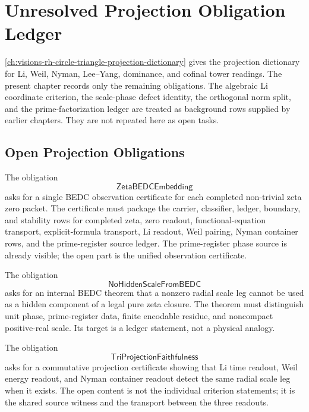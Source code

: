 \chapter{Unresolved Projection Obligation Ledger}
\label{ch:visions-rh-unresolved-projection-obligation-ledger}

\autoref{ch:visions-rh-circle-triangle-projection-dictionary} gives the
projection dictionary for Li, Weil, Nyman, Lee--Yang, dominance, and
cofinal tower readings. The present chapter records only the remaining
obligations. The algebraic Li coordinate criterion, the scale-phase
defect identity, the orthogonal norm split, and the prime-factorization
ledger are treated as background rows supplied by earlier chapters. They
are not repeated here as open tasks.

\section{Open Projection Obligations}
\label{sec:rh-unresolved-projection-obligations}

\begin{definition}
\label{def:rh-zeta-bedc-embedding-obligation}
The obligation
$$
\mathsf{ZetaBEDCEmbedding}
$$
asks for a single BEDC observation certificate for each completed
non-trivial zeta zero packet. The certificate must package the carrier,
classifier, ledger, boundary, and stability rows for completed zeta,
zero readout, functional-equation transport, explicit-formula transport,
Li readout, Weil pairing, Nyman container rows, and the prime-register
source ledger. The prime-register phase source is already visible; the
open part is the unified observation certificate.
\end{definition}

\begin{definition}
\label{def:rh-no-hidden-scale-obligation}
The obligation
$$
\mathsf{NoHiddenScaleFromBEDC}
$$
asks for an internal BEDC theorem that a nonzero radial scale leg cannot
be used as a hidden component of a legal pure zeta closure. The theorem
must distinguish unit phase, prime-register data, finite encodable
residue, and noncompact positive-real scale. Its target is a ledger
statement, not a physical analogy.
\end{definition}

\begin{definition}
\label{def:rh-tri-projection-faithfulness-obligation}
The obligation
$$
\mathsf{TriProjectionFaithfulness}
$$
asks for a commutative projection certificate showing that Li time
readout, Weil energy readout, and Nyman container readout detect the same
radial scale leg when it exists. The open content is not the individual
criterion statements; it is the shared source witness and the transport
between the three readouts.
\end{definition}

